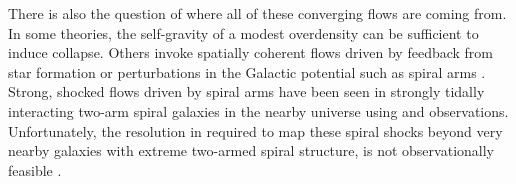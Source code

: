 
There is also the question of where all of these converging flows are coming from. 
In some theories, the self-gravity of a modest overdensity can be sufficient \citep{Kim:2002da,VazquezSemadeni:2007cj,2012MNRAS.425.2157D} to induce collapse. 
Others invoke spatially coherent flows driven by feedback from star formation or perturbations in the Galactic potential such as spiral arms \citep{Roberts:1972bp,Bonnell:2006hn,Fujimoto:2014kh}.
Strong, shocked flows driven by spiral arms have been seen in strongly tidally interacting two-arm spiral galaxies in the nearby universe \citep{Visser:1980vc,Visser:1980ud,Shetty_2007} using \CO and \atomH observations.
Unfortunately, the resolution in \atomH required to map these spiral shocks beyond very nearby galaxies with extreme two-armed spiral structure, is not observationally feasible \cite{Visser:1980ud}.


